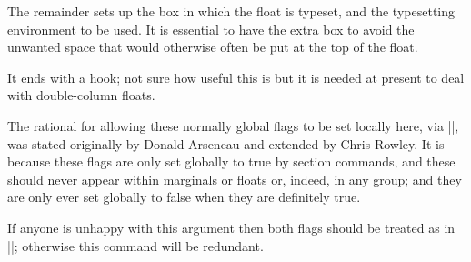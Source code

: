 \begin{macro}{\@xfloat}
    The remainder sets up the box in which the float is typeset, and
    the typesetting environment to be used.  It is essential to have
    the extra box to avoid the unwanted space that would otherwise
    often be put at the top of the float.

    It ends with a hook; not sure how useful this is but it is needed
    at present to deal with double-column floats.
    \begin{teX}
  \global \setbox\@currbox
    \color@vbox
      \normalcolor
      \vbox \bgroup
        \hsize\columnwidth
        \@parboxrestore
        \@floatboxreset
}
    \end{teX}
  \end{macro}
%  
  \begin{macro}{\@floatboxreset}
%    
 The rational for allowing these normally global flags to be set
 locally here, via |\@parboxrestore|, was stated originally by
 Donald Arseneau and extended by Chris Rowley.
 It is because these flags are only set globally to
 true by section commands, and these should never appear within
 marginals or floats or, indeed, in any group; and they are only ever
 set globally to false when they are definitely true.

 If anyone is unhappy with this argument then both flags should be
 treated as in |\set@nobreak|; otherwise this command will be
 redundant. 
    \begin{teX}
\def \@floatboxreset {%
        \reset@font
        \normalsize
        \@setminipage
}
    \end{teX}
  \end{macro}
